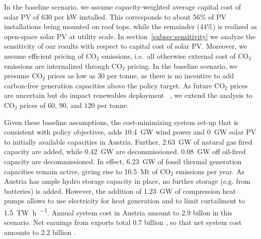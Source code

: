 \documentclass[review, 3p, times]{elsarticle} %
\newcommand{\COO}{\ensuremath{\mathrm{CO_2}} }
\begin{document}
    In the baseline scenario, we assume capacity-weighted average capital cost of solar PV of $630$ \EUR per kW
    installed.
    This corresponds to about 56\% of PV installations being mounted on roof tops, while the remainder (44\%) is
    realized as open-space solar PV at utility scale.
    In section~\ref{subsec:sensitivity} we analyze the sensitivity of our results with respect to capital cost of solar
    PV\@.
    Moreover, we assume efficient pricing of \COO emissions, i.e.\ all otherwise external cost of \COO emissions are
    internalized through \COO pricing.
    In the baseline scenario, we presume \COO prices as low as $30$ \EUR per tonne, as there is no incentive to add
    carbon-free generation capacities above the policy target.
    As future \COO prices are uncertain but do impact renewables deployment ~\citep{Brown2020, Kirchner2019}, we
    extend the analysis to \COO prices of $60$, $90$, and $120$ \EUR per tonne.

    Given these baseline assumptions, the cost-minimizing system set-up that is consistent with policy objectives, adds
    \SI{10.4}{\giga\watt} wind power and \SI{0}{\giga\watt} solar PV to initially available capacities in Austria.
    Further, \SI{2.63}{\giga\watt} of natural gas fired capacity are added, while \SI{0.42}{\giga\watt} are decommissioned.
    \SI{0.08}{\giga\watt} off oil-fired capacity are decommissioned.
    In effect, \SI{6.23}{\giga\watt} of fossil thermal generation capacities remain active, giving rise to
    \SI{10.5}{\mega\tonne} of \COO emissions per year.
    As Austria has ample hydro storage capacity in place, no further storage (e.g. from batteries) is added.
    However, the addition of \SI{1.23}{\giga\watt} of compression heat pumps allows to use electricity for heat
    generation and to limit curtailment to \SI{1.5}{\tera\watt\hour\per\year}.
    Annual system cost in Austria amount to $2.9$ billon \EUR in this scenario.
    Net earnings from exports total $0.7$ billion \EUR, so that net system cost amounts to $2.2$ billion \EUR.
\end{document}
